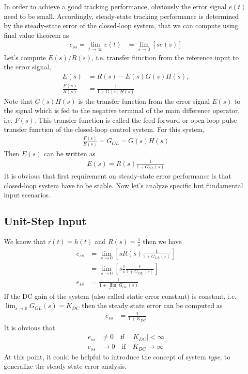 \documentclass[twoside]{article}
\begin{document}
In order to achieve a good tracking performance, obviously 
the error signal $e(t)$ need to be small. Accordingly, steady-state 
tracking performance is determined by the steady-state error
of the closed-loop system, that we can compute using final
value theorem as
%
\begin{align*}
	e_{ss} = \lim_{t\to \infty} e(t) &= \lim_{s \to 0} \left[ s e(s) \right]
\end{align*}
%
Let's compute $E(s)/R(s)$, i.e. transfer function from the reference input to the 
error signal, 
%
\begin{align*}
E(s) &= R(s) - E(s) G(s) H(s)  , 
\\
\frac{E(s)}{R(s)} &= \frac{1}{1 + G(s) H(s) }
\end{align*}
%
Note that $G(s) H(s)$ is the  transfer function from the error
signal $E(s)$ to the signal which is fed to the negative terminal of 
the main difference operator, i.e. $F(s)$. This transfer function is
called the feed-forward or open-loop  pulse transfer function of the 
closed-loop control system. For this system, 
%
\begin{align*}
\frac{F(s)}{E(s)} = G_{OL} = G(s) H(s)
\end{align*}
%
Then $E(s)$ can be written as
%
\begin{align*}
E(s) = R(s) \frac{1}{1 + G_{OL} (s) }
\end{align*}
%
It is obvious that first requirement on steady-state error
performance is that closed-loop system have to be stable.
Now let's analyze specific but fundamental input scenarios. 

\subsection*{Unit-Step Input}

We know that $r(t) = h(t)$ and $R(s) = \frac{1}{s}$ then 
we have
%
\begin{align*}
e_{ss} &= \lim_{s \to 0} \left[ s R(s) \frac{1}{1
         + G_{OL} (s) } \right]
\\
&= \lim_{s \to 0} \left[ s \frac{1}{s} \frac{1}{1
         + G_{OL} (s) } \right]
\\
e_{ss} &= \frac{1}{1 + \lim_{s \to 0} G_{OL} (s) }
\end{align*}
%
If the DC gain of the system (also called static error constant) is
constant, i.e. $\lim_{s \to 0}G_{OL}(s) = K_{DC}$ then the steady state error can be
computed as
%
\begin{align*}
e_{ss} &= \frac{1}{1 + K_{DC}}
\end{align*}
%
It is obvious that 
%
\begin{align*}
e_{ss} &\neq 0 \quad \mathrm{if} \quad |K_{DC}| < \infty
\\
e_{ss} &\to 0 \quad \mathrm{if} \quad K_{DC} \to \infty
\end{align*}
%
At this point, it could be helpful to introduce the concept of system \textit{type},
to generalize the steady-state error analysis. 
\end{document}
